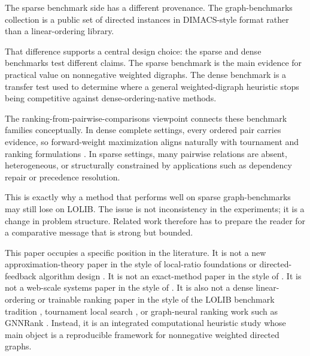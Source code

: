 The sparse benchmark side has a different provenance. The graph-benchmarks collection \cite{graph_benchmarks_repo} is a public set of directed instances in DIMACS-style format rather than a linear-ordering library.

That difference supports a central design choice: the sparse and dense benchmarks test different claims. The sparse benchmark is the main evidence for practical value on nonnegative weighted digraphs. The dense benchmark is a transfer test used to determine where a general weighted-digraph heuristic stops being competitive against dense-ordering-native methods.

The ranking-from-pairwise-comparisons viewpoint connects these benchmark families conceptually. In dense complete settings, every ordered pair carries evidence, so forward-weight maximization aligns naturally with tournament and ranking formulations \cite{ACN08,CFR10}. In sparse settings, many pairwise relations are absent, heterogeneous, or structurally constrained by applications such as dependency repair or precedence resolution.

This is exactly why a method that performs well on sparse graph-benchmarks may still lose on LOLIB. The issue is not inconsistency in the experiments; it is a change in problem structure. Related work therefore has to prepare the reader for a comparative message that is strong but bounded.

This paper occupies a specific position in the literature. It is not a new approximation-theory paper in the style of local-ratio foundations \cite{BYGR98} or directed-feedback algorithm design \cite{DF03,ENSS98}. It is not an exact-method paper in the style of \cite{BSNA21}. It is not a web-scale systems paper in the style of \cite{SST16}. It is also not a dense linear-ordering or trainable ranking paper in the style of the LOLIB benchmark tradition \cite{MRD12}, tournament local search \cite{FLRS10}, or graph-neural ranking work such as GNNRank \cite{GNNRank22}. Instead, it is an integrated computational heuristic study whose main object is a reproducible framework for nonnegative weighted directed graphs.

